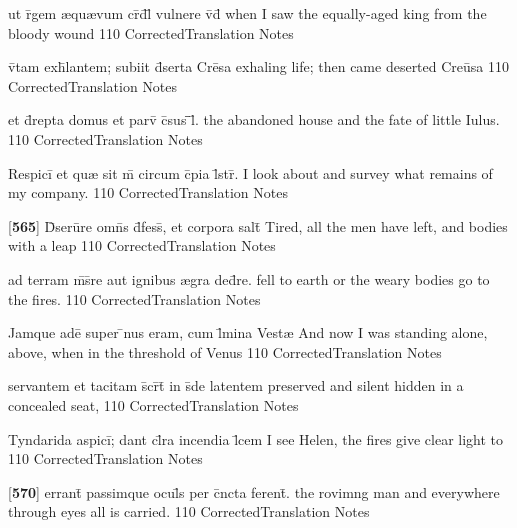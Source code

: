 \latline
  {ut r\={}gem {\ae}qu{\ae}vum cr\={}d\={}l\={\macron {\i}} vulnere v\={\macron {\i}}d\={\macron {\i}}}
  { when I saw the equally-aged king from the bloody wound }
  {110}
  { CorrectedTranslation }
  { Notes }


\latline
  {v\={\macron {\i}}tam exh\={}lantem; subiit d\={}serta Cre\={}sa }
  { exhaling life; then came deserted Cre\={u}sa }
  {110}
  { CorrectedTranslation }
  { Notes }


\latline
  {et d\={\macron {\i}}repta domus et parv\={\macron {\i}} c\={}sus \={\macron {\i}}\={}l\={\macron {\i}}.}
  { the abandoned house and the fate of little Iulus. }
  {110}
  { CorrectedTranslation }
  { Notes }


\latline
  {Respici\={} et qu{\ae} sit m\={} circum c\={}pia l\={}str\={}.}
  { I look about and survey what remains of my company. }
  {110}
  { CorrectedTranslation }
  { Notes }


\latline
  {[\textbf{565}] D\={}seru\={}re omn\={}s d\={}fess\={\macron {\i}}, et corpora salt\={}}
  { Tired, all the men have left, and bodies with a leap }
  {110}
  { CorrectedTranslation }
  { Notes }


\latline
  {ad terram m\={\macron {\i}}s\={}re aut ignibus {\ae}gra ded\={}re.}
  { fell to earth or the weary bodies go to the fires.  }
  {110}
  { CorrectedTranslation }
  { Notes }


\latline
  {Jamque ade\={} super \={}nus eram, cum l\={\macron {\i}}mina Vest{\ae}}
  { And now I was standing alone, above, when in the threshold of Venus }
  {110}
  { CorrectedTranslation }
  { Notes }


\latline
  {servantem et tacitam s\={}cr\={}t\={} in s\={}de latentem}
  { preserved and silent hidden in a concealed seat, }
  {110}
  { CorrectedTranslation }
  { Notes }


\latline
  {Tyndarida aspici\={}; dant cl\={}ra incendia l\={}cem}
  { I see Helen, the fires give clear light to }
  {110}
  { CorrectedTranslation }
  { Notes }


\latline
  {[\textbf{570}] errant\={\macron {\i}} passimque ocul\={}s per c\={}ncta ferent\={\macron {\i}}.}
  { the rovimng man and everywhere through eyes all is carried. }
  {110}
  { CorrectedTranslation }
  { Notes }



